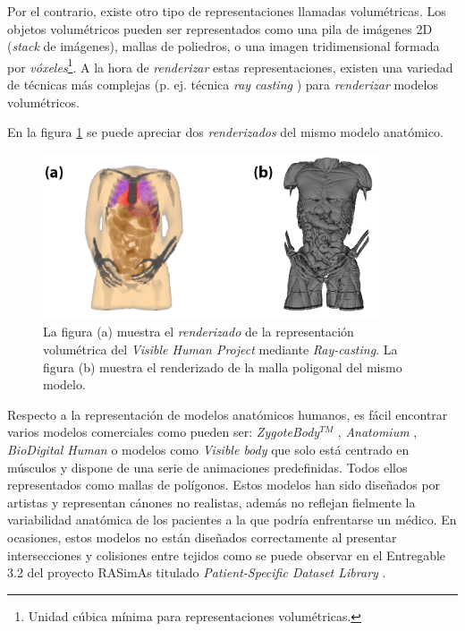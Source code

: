 Por el contrario, 
existe otro tipo de representaciones  llamadas volumétricas. Los objetos volumétricos pueden ser representados como una pila de imágenes 2D (\emph{stack} de imágenes), mallas de poliedros, o una imagen  tridimensional formada por \emph{vóxeles}\footnote{Unidad cúbica mínima para representaciones volumétricas.}. A la hora de \emph{renderizar} estas representaciones, existen una variedad de técnicas más complejas (p. ej. técnica \emph{ray casting} \cite{isabel}) para \emph{renderizar} modelos volumétricos.


En la figura \ref{fig:HVP} se puede apreciar dos \emph{renderizados} del mismo modelo anatómico.

\begin{figure}[ht]
   \centering
    \includegraphics[width=0.9\textwidth]{IMG/volvsb-rep.png}
    \caption{La figura (a) muestra el \emph{renderizado} de la representación volumétrica del \emph{Visible Human Project} \cite{ackerman1998visible} mediante \emph{Ray-casting}. La figura (b) muestra el renderizado de la malla poligonal del mismo modelo. }
   \label{fig:HVP}
\end{figure}



Respecto a la representación de modelos anatómicos humanos, es fácil encontrar  varios modelos comerciales como pueden ser: \emph{ZygoteBody}$^{TM}$ \cite{kelc2012zygote}, \emph{Anatomium} \cite{Anatomium}, \emph{BioDigital Human} \cite{qualter2012biodigital} o modelos como \emph{Visible body} \cite{visible2012visible} que solo está centrado en músculos y dispone de una serie de animaciones predefinidas. Todos ellos representados como mallas de polígonos. Estos modelos han sido diseñados por artistas y representan cánones no realistas, además no reflejan fielmente la variabilidad anatómica de los pacientes a la que podría enfrentarse un médico. En ocasiones, estos modelos no están diseñados correctamente al presentar intersecciones y colisiones entre tejidos como se puede observar en el Entregable 3.2 del proyecto \ac{RASimAs} titulado \emph{Patient-Specific Dataset Library} \cite{ded3.2}.

